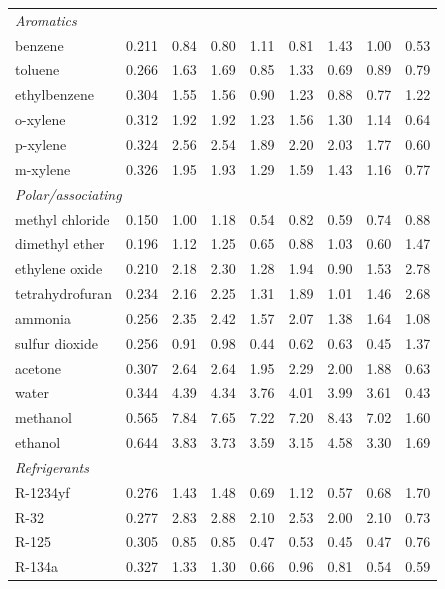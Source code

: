 \begin{table}[H]
\begin{tabular}{lcccccccc}
\multicolumn{9}{l}{\emph{Aromatics}} \\
benzene & 0.211 & 0.84 & 0.80 & 1.11 & 0.81 & 1.43 & 1.00 & 0.53 \\
toluene & 0.266 & 1.63 & 1.69 & 0.85 & 1.33 & 0.69 & 0.89 & 0.79 \\
ethylbenzene & 0.304 & 1.55 & 1.56 & 0.90 & 1.23 & 0.88 & 0.77 & 1.22 \\
o-xylene & 0.312 & 1.92 & 1.92 & 1.23 & 1.56 & 1.30 & 1.14 & 0.64 \\
p-xylene & 0.324 & 2.56 & 2.54 & 1.89 & 2.20 & 2.03 & 1.77 & 0.60 \\
m-xylene & 0.326 & 1.95 & 1.93 & 1.29 & 1.59 & 1.43 & 1.16 & 0.77 \\
\multicolumn{9}{l}{\emph{Polar/associating}} \\
methyl chloride & 0.150 & 1.00 & 1.18 & 0.54 & 0.82 & 0.59 & 0.74 & 0.88 \\
dimethyl ether & 0.196 & 1.12 & 1.25 & 0.65 & 0.88 & 1.03 & 0.60 & 1.47 \\
ethylene oxide & 0.210 & 2.18 & 2.30 & 1.28 & 1.94 & 0.90 & 1.53 & 2.78 \\
tetrahydrofuran & 0.234 & 2.16 & 2.25 & 1.31 & 1.89 & 1.01 & 1.46 & 2.68 \\
ammonia & 0.256 & 2.35 & 2.42 & 1.57 & 2.07 & 1.38 & 1.64 & 1.08 \\
sulfur dioxide & 0.256 & 0.91 & 0.98 & 0.44 & 0.62 & 0.63 & 0.45 & 1.37 \\
acetone & 0.307 & 2.64 & 2.64 & 1.95 & 2.29 & 2.00 & 1.88 & 0.63 \\
water & 0.344 & 4.39 & 4.34 & 3.76 & 4.01 & 3.99 & 3.61 & 0.43 \\
methanol & 0.565 & 7.84 & 7.65 & 7.22 & 7.20 & 8.43 & 7.02 & 1.60 \\
ethanol & 0.644 & 3.83 & 3.73 & 3.59 & 3.15 & 4.58 & 3.30 & 1.69 \\
\multicolumn{9}{l}{\emph{Refrigerants}} \\
R-1234yf & 0.276 & 1.43 & 1.48 & 0.69 & 1.12 & 0.57 & 0.68 & 1.70 \\
R-32 & 0.277 & 2.83 & 2.88 & 2.10 & 2.53 & 2.00 & 2.10 & 0.73 \\
R-125 & 0.305 & 0.85 & 0.85 & 0.47 & 0.53 & 0.45 & 0.47 & 0.76 \\
R-134a & 0.327 & 1.33 & 1.30 & 0.66 & 0.96 & 0.81 & 0.54 & 0.59 \\
\bottomrule
\end{tabular}
\end{table}
